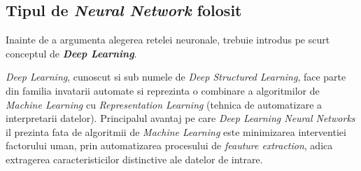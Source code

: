 \documentclass[a4paper]{article}
\begin{document}
\subsection{Tipul de \textit{Neural Network} folosit}
Inainte de a argumenta alegerea retelei neuronale, trebuie introdus pe scurt conceptul
de \textbf{\textit{Deep Learning}}.

\textit{Deep Learning}, cunoscut si sub numele de \textit{Deep Structured Learning},
face parte din familia invatarii automate si reprezinta o combinare a algoritmilor de \textit{Machine Learning} cu
\textit{Representation Learning} (tehnica de automatizare a interpretarii datelor). Principalul avantaj pe care
\textit{Deep Learning Neural Networks} il prezinta fata de algoritmii de \textit{Machine Learning} este minimizarea
interventiei factorului uman, prin automatizarea procesului de \textit{feauture extraction}, adica extragerea
caracteristicilor distinctive ale datelor de intrare.
\end{document}
